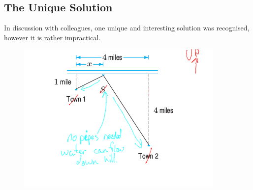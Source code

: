 \newpage
\subsection{The Unique Solution}
In discussion with colleagues, one unique and interesting solution was
recognised, however it is rather impractical.
\begin{figure}[h]
  \includegraphics[width=\linewidth]{solutions/q4/downhill.png}
\end{figure}
